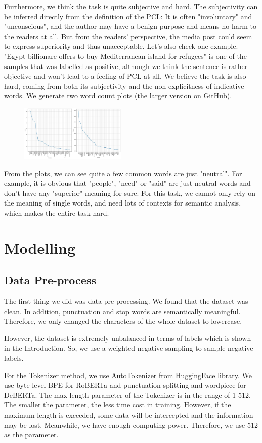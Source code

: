 \documentclass[11pt,a4paper]{article}
\begin{document}
Furthermore, we think the task is quite subjective and hard. The subjectivity can be inferred directly from the definition of the PCL: It is often "involuntary" and "unconscious", and the author may have a benign purpose and means no harm to the readers at all. But from the readers' perspective, the media post could seem to express superiority and thus unacceptable. Let's also check one example. "Egypt billionare offers to buy Mediterranean island for refugees" is one of the samples that was labelled as positive, although we think the sentence is rather objective and won't lead to a feeling of PCL at all. We believe the task is also hard, coming from both its subjectivity and the non-explicitness of indicative words. We generate two word count plots (the larger version on GitHub).
\begin{figure}[h]
\includegraphics[width=0.45\textwidth, height=75pt]{figures/word_count_plot.jpg}
\end{figure}
From the plots, we can see quite a few common words are just "neutral". For example, it is obvious that "people", "need" or "said" are just neutral words and don't have any "superior" meaning for sure. For this task, we cannot only rely on the meaning of single words, and need lots of contexts for semantic analysis, which makes the entire task hard.
\section{Modelling} 
\subsection{Data Pre-process}
The first thing we did was data pre-processing. We found that the dataset was clean. In addition, punctuation and stop words are semantically meaningful. Therefore, we only changed the characters of the whole dataset to lowercase.

However, the dataset is extremely unbalanced in terms of labels which is shown in the Introduction. So, we use a weighted negative sampling to sample negative labels.

For the Tokenizer method, we use AutoTokenizer from HuggingFace library. We use byte-level BPE for RoBERTa and punctuation splitting and wordpiece for DeBERTa. The max-length parameter of the Tokenizer is in the range of 1-512. The smaller the parameter, the less time cost in training. However, if the maximum length is exceeded, some data will be intercepted and the information may be lost. Meanwhile, we have enough computing power. Therefore, we use 512 as the parameter.
\end{document}
